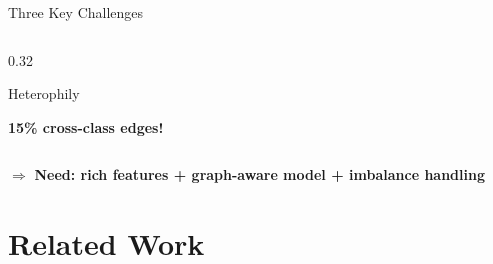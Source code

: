 \documentclass[aspectratio=169, 10pt]{beamer}
\begin{document}
\begin{frame}{Three Key Challenges}
\begin{columns}[T]
\begin{column}{0.32\textwidth}
\begin{block}{\centering Heterophily}
\vspace{0.1cm}
\centering\scriptsize\color{accentred}\textbf{15\% cross-class edges!}
\end{block}
\end{column}
\end{columns}
\vspace{0.5cm}
\begin{center}
\Large $\Longrightarrow$ \textbf{Need: rich features + graph-aware model + imbalance handling}
\end{center}
\end{frame}

\section{Related Work}
\end{document}
